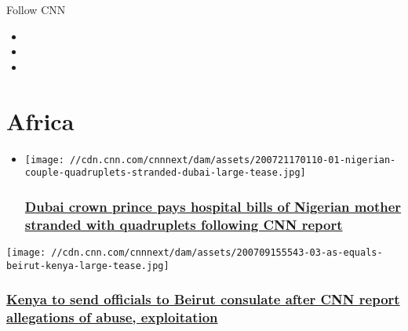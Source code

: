 Follow CNN

\begin{itemize}
\item
\item
\item
\end{itemize}

\hypertarget{africa}{%
\section{Africa}\label{africa}}

\begin{itemize}
\item
  \href{/2020/07/30/africa/dubai-ruler-pays-nigerian-mom-hospital-bills/index.html}{}

  \texttt{[image: //cdn.cnn.com/cnnnext/dam/assets/200721170110-01-nigerian-couple-quadruplets-stranded-dubai-large-tease.jpg]}

  \hypertarget{dubai-crown-prince-pays-hospital-bills-of-nigerian-mother-stranded-with-quadruplets-following-cnn-report}{%
  \subsubsection{\texorpdfstring{\href{/2020/07/30/africa/dubai-ruler-pays-nigerian-mom-hospital-bills/index.html}{Dubai
  crown prince pays hospital bills of Nigerian mother stranded with
  quadruplets following CNN
  report}}{Dubai crown prince pays hospital bills of Nigerian mother stranded with quadruplets following CNN report}}\label{dubai-crown-prince-pays-hospital-bills-of-nigerian-mother-stranded-with-quadruplets-following-cnn-report}}
\end{itemize}

\href{/2020/07/30/africa/kenya-consulate-beirut-mission-probe-intl/index.html}{}

\texttt{[image: //cdn.cnn.com/cnnnext/dam/assets/200709155543-03-as-equals-beirut-kenya-large-tease.jpg]}

\hypertarget{kenya-to-send-officials-to-beirut-consulate-after-cnn-report-allegations-of-abuse-exploitation}{%
\subsubsection{\texorpdfstring{\href{/2020/07/30/africa/kenya-consulate-beirut-mission-probe-intl/index.html}{Kenya
to send officials to Beirut consulate after CNN report allegations of
abuse,
exploitation}}{Kenya to send officials to Beirut consulate after CNN report allegations of abuse, exploitation}}\label{kenya-to-send-officials-to-beirut-consulate-after-cnn-report-allegations-of-abuse-exploitation}}

